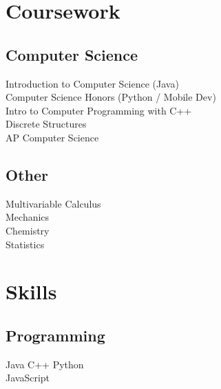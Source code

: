 \documentclass[]{deedy-resume-openfont}
\begin{document}
\begin{minipage}[t]{0.33\textwidth}

\section{Coursework}
\subsection{Computer Science}
Introduction to Computer Science (Java) \\
Computer Science Honors (Python / Mobile Dev) \\
Intro to Computer Programming with C++ \\
Discrete Structures \\
AP Computer Science \\
\sectionsep

\subsection{Other}
Multivariable Calculus \\
Mechanics \\
Chemistry \\
Statistics \\

\sectionsep


\section{Skills}
\subsection{Programming}
Java \textbullet{} C++ \textbullet{} Python \\
JavaScript
\sectionsep

%
%

\end{minipage} 
\hfill
\end{document}
